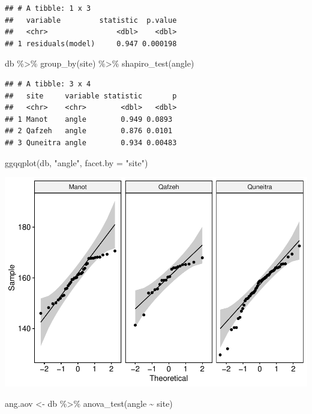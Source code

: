 \documentclass[
]{article}
\newenvironment{Shaded}{\begin{snugshade}}{\end{snugshade}}
\newcommand{\AttributeTok}[1]{\textcolor[rgb]{0.77,0.63,0.00}{#1}}
\newcommand{\FunctionTok}[1]{\textcolor[rgb]{0.00,0.00,0.00}{#1}}
\newcommand{\NormalTok}[1]{#1}
\newcommand{\OtherTok}[1]{\textcolor[rgb]{0.56,0.35,0.01}{#1}}
\newcommand{\SpecialCharTok}[1]{\textcolor[rgb]{0.00,0.00,0.00}{#1}}
\newcommand{\StringTok}[1]{\textcolor[rgb]{0.31,0.60,0.02}{#1}}
\begin{document}
\begin{verbatim}
## # A tibble: 1 x 3
##   variable         statistic  p.value
##   <chr>                <dbl>    <dbl>
## 1 residuals(model)     0.947 0.000198
\end{verbatim}

\begin{Shaded}
\begin{Highlighting}[]
\NormalTok{db }\SpecialCharTok{\%\textgreater{}\%}
  \FunctionTok{group\_by}\NormalTok{(site) }\SpecialCharTok{\%\textgreater{}\%}
  \FunctionTok{shapiro\_test}\NormalTok{(angle)}
\end{Highlighting}
\end{Shaded}

\begin{verbatim}
## # A tibble: 3 x 4
##   site     variable statistic       p
##   <chr>    <chr>        <dbl>   <dbl>
## 1 Manot    angle        0.949 0.0893 
## 2 Qafzeh   angle        0.876 0.0101 
## 3 Quneitra angle        0.934 0.00483
\end{verbatim}

\begin{Shaded}
\begin{Highlighting}[]
\FunctionTok{ggqqplot}\NormalTok{(db, }\StringTok{"angle"}\NormalTok{, }\AttributeTok{facet.by =} \StringTok{"site"}\NormalTok{)}
\end{Highlighting}
\end{Shaded}

\includegraphics{incisionangles_files/figure-latex/unnamed-chunk-6-3.pdf}

\begin{Shaded}
\begin{Highlighting}[]
\NormalTok{ang.aov }\OtherTok{\textless{}{-}}\NormalTok{ db }\SpecialCharTok{\%\textgreater{}\%} \FunctionTok{anova\_test}\NormalTok{(angle }\SpecialCharTok{\textasciitilde{}}\NormalTok{ site)}
\end{Highlighting}
\end{Shaded}
\end{document}
